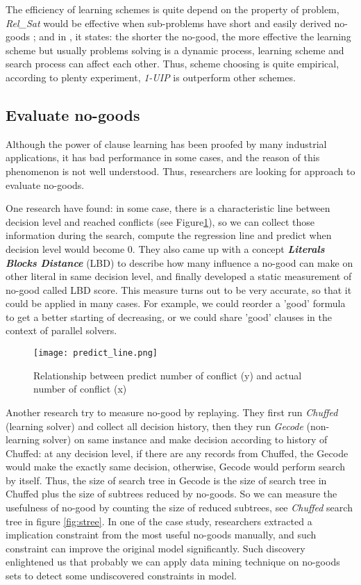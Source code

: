 \documentclass{article}
\begin{document}
The efficiency of learning schemes is quite depend on the property of problem, \textit{Rel\_Sat} would be effective when sub-problems have short and easily derived no-goods \cite{bayardo1997using}; and in \cite{zhang2001efficient}, it states: the shorter the no-good, the more effective the learning scheme but usually problems solving is a dynamic process, learning scheme and search process can affect each other. Thus, scheme choosing is quite empirical, according to plenty experiment, \textit{1-UIP} is outperform other schemes.

\subsection{Evaluate no-goods}
Although the power of clause learning has been proofed by many industrial applications, it has bad performance in some cases, and the reason of this phenomenon is not well understood. Thus, researchers are looking for approach to evaluate no-goods.
 
One research\cite{audemard2009predicting} have found: in some case, there is a characteristic line between decision level and reached conflicts (see Figure\ref{fig:pline}), so we can collect those information during the search, compute the regression line and predict when decision level would become $0$. They also came up with a concept \textbf{\textit{Literals Blocks Distance}} (LBD) to describe how many influence a no-good can make on other literal in same decision level, and finally developed a static measurement of no-good called LBD score. This measure turns out to be very accurate, so that it could be applied in many cases. For example, we could reorder a 'good' formula to get a better starting of decreasing, or we could share 'good' clauses in the context of parallel solvers.

\begin{figure}
    \centering
    \texttt{[image: predict\_line.png]}
    \caption{Relationship between predict number of conflict (y) and actual number of conflict (x)\cite{audemard2009predicting}}
    \label{fig:pline}
\end{figure}

Another research\cite{shishmarev2016learning} try to measure no-good by replaying. They first run \textit{Chuffed} (learning solver) and collect all decision history, then they run \textit{Gecode} (non-learning solver) on same instance and make decision according to history of Chuffed: at any decision level, if there are any records from Chuffed, the Gecode would make the exactly same decision, otherwise, Gecode would perform search by itself. Thus, the size of search tree in Gecode is the size of search tree in Chuffed plus the size of subtrees reduced by no-goods. So we can measure the usefulness of no-good by counting the size of reduced subtrees, see \textit{Chuffed} search tree in figure \ref{fig:stree}. In one of the case study, researchers extracted a implication constraint from the most useful no-goods manually, and such constraint can improve the original model significantly. Such discovery enlightened us that probably we can apply data mining technique on no-goods sets to detect some undiscovered constraints in model.
\end{document}
